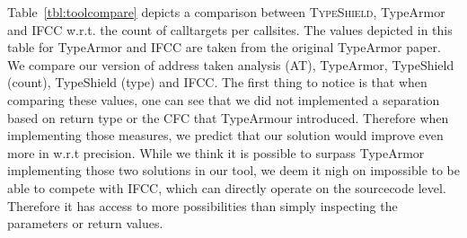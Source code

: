Table~\ref{tbl:toolcompare} depicts a comparison between \textsc{TypeShield}, TypeArmor and IFCC w.r.t. the count of calltargets per callsites.
The values depicted in this table for TypeArmor and IFCC are taken from the original TypeArmor paper.
We compare our version of address taken analysis (AT), TypeArmor, TypeShield (count), TypeShield (type) and IFCC. 
The first thing to notice is that when comparing these values, one can see that we did not implemented a separation based on return type or the 
CFC that TypeArmour introduced. Therefore when implementing those measures, we predict that our solution would improve even more in w.r.t precision.
While we think it is possible to surpass TypeArmor implementing those two solutions in our tool, we deem it nigh on impossible to be able to compete with IFCC,
which can directly operate on the sourcecode level. Therefore it has access to more possibilities than simply inspecting the parameters or return values.





